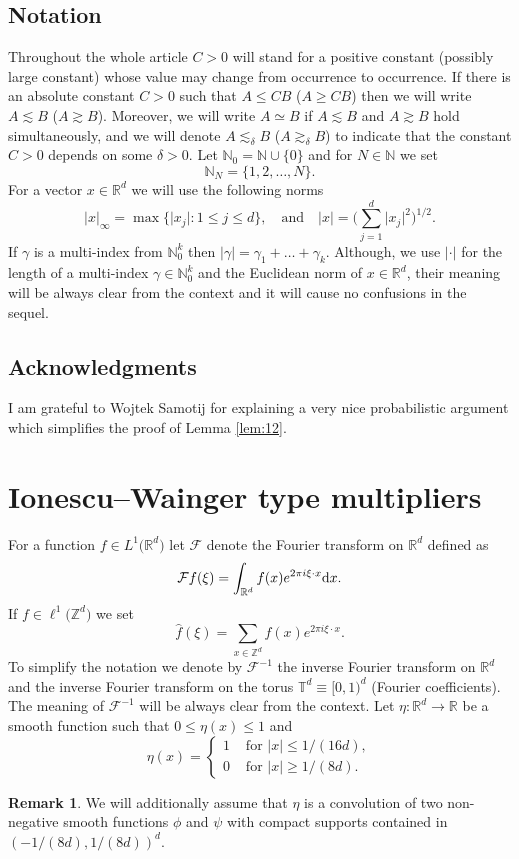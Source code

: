 \documentclass[a4paper,oneside]{amsart}
\theoremstyle{plain}
\theoremstyle{definition}
\newtheorem{remark}{Remark}[section]
\numberwithin{equation}{section}
\theoremstyle{plain}
\newcommand{\RR}{\mathbb{R}}
\newcommand{\ZZ}{\mathbb{Z}}
\newcommand{\TT}{\mathbb{T}}
\newcommand{\NN}{\mathbb{N}}
\newcommand{\calF}{\mathcal{F}}
\newcommand{\norm}[1]{{\left\lvert #1 \right\rvert}}
\newcommand{\sprod}[2] {{#1 \cdot #2}}
\newcommand{\abs}[1]{{\lvert {#1} \rvert}}
\newcommand{\8}{\infty}
\begin{document}
 

\subsection{Notation}
Throughout the whole article $C > 0$ will stand for a positive constant (possibly
large constant) whose value may change from occurrence to
occurrence.  If there is an absolute constant $C>0$ such that $A\le CB$ ($A\ge
CB$) then we will  write $A \lesssim B$ ($A \gtrsim
B$).  Moreover,  we will write $A \simeq B$ if $A \lesssim B$ and $A\gtrsim
B$ hold simultaneously, and  we will denote $A \lesssim_{\delta} B$
($A \gtrsim_{\delta} B$) to indicate that the constant $C>0$ depends
on some $\delta > 0$. Let $\NN_0 = \NN \cup \{0\}$ and for $N \in \NN$ we
set
\[
    \NN_N = \big\{1, 2, \ldots, N\big\}.
\]
For a vector $x \in \RR^d$ we will use the following norms
\[
    \norm{x}_\infty = \max\{\abs{x_j} : 1 \leq j \leq d\}, \quad \text{and} \quad
    \norm{x} = \Big(\sum_{j = 1}^d \abs{x_j}^2\Big)^{1/2}.
\]
If $\gamma$ is a multi-index from $\NN_0^k$ then $\norm{\gamma} = \gamma_1 + \ldots
+ \gamma_k$. Although, we use $|\cdot|$ for the length of a
multi-index $\gamma\in \NN_0^k$
and the Euclidean norm of $x\in\RR^d$, their meaning will be always
clear from the context and it will cause no confusions in
the sequel. 



\subsection*{Acknowledgments}
I am grateful to Wojtek Samotij for explaining  a very
nice probabilistic argument which simplifies the proof of Lemma \ref{lem:12}.






\section{ Ionescu--Wainger type multipliers}
\label{sec:6}


For a function 
$f \in L^1\big(\RR^d\big)$ let $\calF$ denote the Fourier transform on $\RR^d$ defined as
$$
\calF f(\xi) = \int_{\RR^d} f(x) e^{2\pi i \sprod{\xi}{x}} {\rm d}x.
$$
If $f \in \ell^1\big(\ZZ^d\big)$ we set
$$
\hat{f}(\xi) = \sum_{x \in \ZZ^d} f(x) e^{2\pi i \sprod{\xi}{x}}.
$$
To simplify the notation we denote by $\mathcal F^{-1}$ the inverse
Fourier transform on $\RR^d$ and the inverse Fourier transform on the
torus $\TT^d\equiv[0, 1)^d$ (Fourier coefficients). The meaning of
$\calF^{-1}$ will be always clear from the context.  Let $\eta: \RR^d
\rightarrow \RR$ be a smooth function such that $0 \leq \eta(x) \leq
1$ and
\[
\eta(x) =
\begin{cases}
	1 & \text{ for } \norm{x} \leq 1/(16 d),\\
	0 & \text{ for } \norm{x} \geq 1/(8 d).
\end{cases}
\]
\begin{remark}
\label{rem:1}
We will additionally assume that $\eta$ is a convolution of two non-negative smooth functions
$\phi$ and $\psi$ with compact supports contained in $(-1/(8d), 1/(8d))^d$.   
\end{remark}
\end{document}
